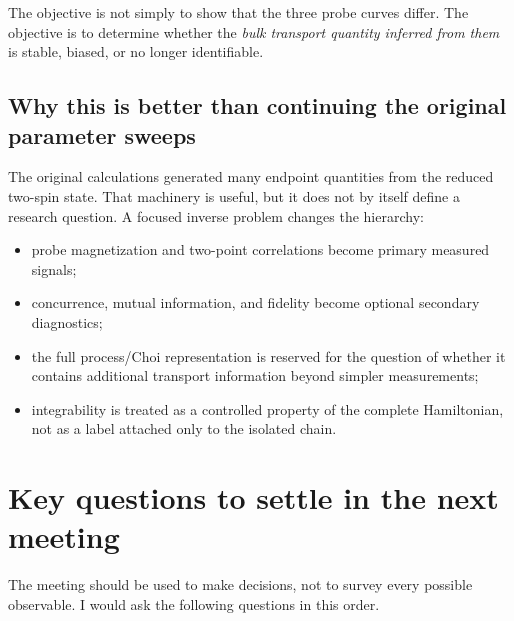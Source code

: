 \documentclass[11pt,a4paper]{article}
\begin{document}
The objective is not simply to show that the three probe curves differ.  The objective is to determine whether the \emph{bulk transport quantity inferred from them} is stable, biased, or no longer identifiable.

\subsection{Why this is better than continuing the original parameter sweeps}
The original calculations generated many endpoint quantities from the reduced two-spin state.  That machinery is useful, but it does not by itself define a research question.  A focused inverse problem changes the hierarchy:
\begin{itemize}[leftmargin=0.8cm]
    \item probe magnetization and two-point correlations become primary measured signals;
    \item concurrence, mutual information, and fidelity become optional secondary diagnostics;
    \item the full process/Choi representation is reserved for the question of whether it contains additional transport information beyond simpler measurements;
    \item integrability is treated as a controlled property of the complete Hamiltonian, not as a label attached only to the isolated chain.
\end{itemize}

\section{Key questions to settle in the next meeting}

The meeting should be used to make decisions, not to survey every possible observable.  I would ask the following questions in this order.
\end{document}
